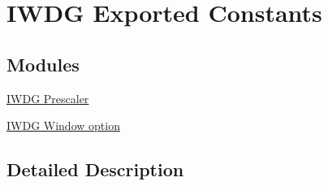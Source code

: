 \hypertarget{group___i_w_d_g___exported___constants}{}\section{I\+W\+DG Exported Constants}
\label{group___i_w_d_g___exported___constants}
\subsection*{Modules}
\begin{DoxyCompactItemize}
\item 
\hyperlink{group___i_w_d_g___prescaler}{I\+W\+D\+G Prescaler}
\item 
\hyperlink{group___i_w_d_g___window__option}{I\+W\+D\+G Window option}
\end{DoxyCompactItemize}


\subsection{Detailed Description}
